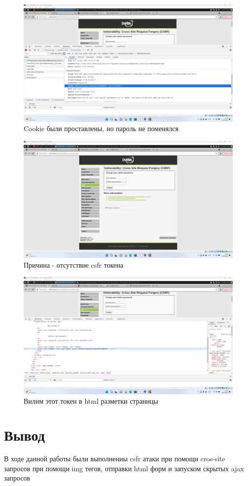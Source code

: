 \documentclass[a4paper]{article}
\begin{document}
  \begin{figure}[H]
    \centering
    \includegraphics[width=\textwidth]{Screenshot_110}
    \caption{Cookie были проставлены, но пароль не поменялся}
  \end{figure}

  \begin{figure}[H]
    \centering
    \includegraphics[width=\textwidth]{Screenshot_111}
    \caption{Причина - отсутствие csfr токена}
  \end{figure}

  \begin{figure}[H]
    \centering
    \includegraphics[width=\textwidth]{Screenshot_112}
    \caption{Вилим этот токен в html разметки страницы}
  \end{figure}

\newpage
\section{Вывод}

В ходе данной работы были выполнениы csfr атаки при помощи cros-site запросов при помощи img тегов, отправки html форм и запуском скрытых ajax запросов
\end{document}
